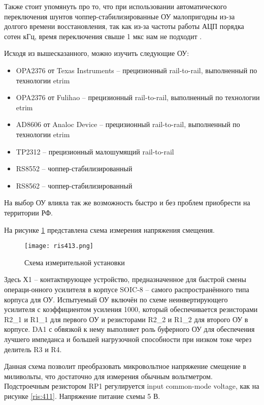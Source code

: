 Также стоит упомянуть про то, что при использовании автоматического переключения шунтов 
чоппер-стабилизированные ОУ малопригодны из-за долгого времени восстановления, так как из-за частоты работы
АЦП порядка сотен кГц, время переключения свыше 1 мкс нам не подходит \cite{Chopper:OU}.

Исходя из вышесказанного, можно изучить следующие ОУ:

\begin{itemize}
    \item OPA2376 от Texas Instruments -- прецизионный rail-to-rail, выполненный по технологии etrim
    \item OPA2376 от Fulihao -- прецизионный rail-to-rail, выполненный по технологии etrim
    \item AD8606 от Analoc Device -- прецизионный rail-to-rail, выполненный по технологии etrim
    \item TP2312 -- прецизионный малошумящий rail-to-rail
    \item RS8552 -- чоппер-стабилизированный
    \item RS8562 -- чоппер-стабилизированный
\end{itemize}

На выбор ОУ влияла так же возможность быстро и без проблем приобрести на территории РФ. 

На рисунке \ref{ris:413} представлена схема измерения напряжения смещения.

\begin{figure}[H]
    \centering
    \texttt{[image: ris413.png]}
    \caption{Схема измерительной установки}
    \label{ris:413}
    \end{figure}

Здесь Х1 -- контактирующее устройство, предназначенное для быстрой смены операци-онного усилителя в 
корпусе SOIC-8 -- самого распространённого типа корпуса для ОУ. Испытуемый ОУ включён по схеме неинвертирующего 
усилителя с коэффициентом усиления 1000, который обеспечивается резисторами R2\_1 и R1\_1 для первого ОУ и
резисторами R2\_2 и R1\_2 для второго ОУ в корпусе. DA1 с обвязкой к нему выполняет роль буферного ОУ для 
обеспечения лучшего импеданса и большей нагрузочной способности при низком токе через делитель R3 и R4.

Данная схема позволит преобразовать микровольтное напряжение смещение в миливольты, что достаточно для 
измерения обычным вольтметром. Подстроечным резистором RP1 регулируется input common-mode voltage, как 
на рисунке \ref{ris:411}. Напряжение питание схемы 5 В.

